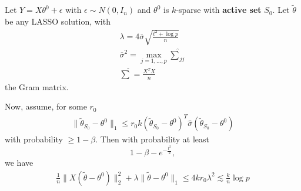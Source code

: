 \begin{thm}
  \label{defn:high_dimensional_statistics:1}
  Let $Y = X \theta^{0} + \epsilon$ with $\epsilon \sim N(0, I_{n})$
  and $\theta^{0}$ is $k$-sparse with \textbf{active set} $S_{0}$. Let
  $\tilde \theta$ be any LASSO solution, with
  \begin{align}
    \label{eq:118}
    \lambda = 4 \overline \sigma \sqrt{\frac{t^{2} + \log p}{n}} \\
    \overline \sigma^{2} = \max_{j = 1, \dots, p} \hat \sum_{jj} \\
    \hat \sum = \frac{X^{T} X}{n}
  \end{align} the Gram matrix.

  Now, assume, for some $r_{0}$
  \begin{align}
    \label{eq:119}
    \| \tilde \theta_{S_{0}} - \theta^{0} \|_{1} \leq r_{0} k (\tilde
    \theta_{S_{0}} - \theta^{0})^{T} \hat \sigma (\tilde
    \theta_{S_{0}} - \theta^{0})
  \end{align} with probability $\geq 1 - \beta$.  Then with
  probability at least
  \begin{equation}
    \label{eq:120}
    1 - \beta - e^{-\frac{t^{2}}{2}},
  \end{equation} we have
  \begin{align}
    \label{eq:121}
    \frac{1}{n} \| X (\tilde \theta - \theta^{0}) \|_{2}^{2} + \lambda
    \| \tilde \theta - \theta^{0} \|_{1} \leq  4 k r_{0} \lambda^{2} 
    \lesssim \frac{k}{n}\log p
  \end{align}
\end{thm}

